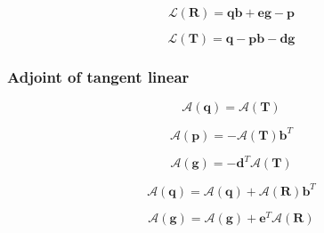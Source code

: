 \begin{equation}
\mathcal{L}(\mathbf{R}) = \mathbf{q}\mathbf{b} + \mathbf{e}\mathbf{g} - \mathbf{p}
\label{eq:global_r_and_t_from_eigenvalues_matrix-tangent_linear-U}
\end{equation}

\begin{equation}
\mathcal{L}(\mathbf{T}) = \mathbf{q} - \mathbf{p}\mathbf{b} - \mathbf{d}\mathbf{g}
\label{eq:global_r_and_t_from_eigenvalues_matrix-tangent_linear-W}
\end{equation}


%
\subsubsection{Adjoint of tangent linear}
\label{sec:global_r_and_t_from_eigenvalues_matrix-adjoint_of_tangent_linear}

\begin{equation}
\mathcal{A}(\mathbf{q}) = \mathcal{A}(\mathbf{T})
\label{eq:global_r_and_t_from_eigenvalues_matrix-adjoint_of_tangent_linear-q_a}
\end{equation}

\begin{equation}
\mathcal{A}(\mathbf{p}) = -\mathcal{A}(\mathbf{T})\mathbf{b}^{T}
\label{eq:global_r_and_t_from_eigenvalues_matrix-adjoint_of_tangent_linear-p_a}
\end{equation}

\begin{equation}
\mathcal{A}(\mathbf{g}) = -\mathbf{d}^{T}\mathcal{A}(\mathbf{T})
\label{eq:global_r_and_t_from_eigenvalues_matrix-adjoint_of_tangent_linear-g_a}
\end{equation}

\begin{equation}
\mathcal{A}(\mathbf{q}) = \mathcal{A}(\mathbf{q}) + \mathcal{A}(\mathbf{R})\mathbf{b}^{T}
\label{eq:global_r_and_t_from_eigenvalues_matrix-adjoint_of_tangent_linear-q_a2}
\end{equation}

\begin{equation}
\mathcal{A}(\mathbf{g}) = \mathcal{A}(\mathbf{g}) + \mathbf{e}^{T}\mathcal{A}(\mathbf{R})
\label{eq:global_r_and_t_from_eigenvalues_matrix-adjoint_of_tangent_linear-g_a2}
\end{equation}

